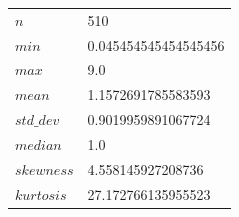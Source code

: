 \documentclass[a4paper,10pt]{article}
\begin{document}
\bigskip 
\bigskip \bigskip 
\begin{center}

\begin{tabular}{|l|l|}
 \hline
$n$ & 510\\ 
$min$ & 0.045454545454545456\\ 
$max$ & 9.0\\ 
$mean$ & 1.1572691785583593\\ 
$std\_dev$ & 0.9019959891067724\\ 
$median$ & 1.0\\ 
$skewness$ & 4.558145927208736\\ 
$kurtosis$ & 27.172766135955523\\ 
\hline
\end{tabular}
\end{center}
\newpage
\end{document}
